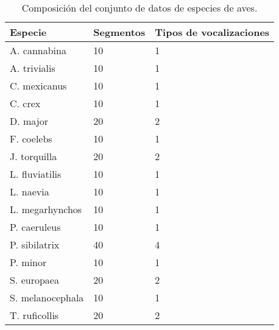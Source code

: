 \begin{table}[h]
    \centering
    \begin{tabular}{lll}
        \hline
        Especie & Segmentos & Tipos de vocalizaciones   \\ \hline
        A. cannabina & 10 & 1                           \\
        A. trivialis & 10 & 1                           \\
        C. mexicanus & 10 & 1                           \\
        C. crex & 10 & 1                                \\
        D. major & 20 & 2                               \\
        F. coelebs & 10 & 1                             \\
        J. torquilla & 20 & 2                           \\
        L. fluviatilis & 10 & 1                         \\
        L. naevia & 10 & 1                              \\
        L. megarhynchos & 10 & 1                        \\
        P. caeruleus & 10 & 1                           \\
        P. sibilatrix & 40 & 4                          \\
        P. minor & 10 & 1                               \\
        S. europaea & 20 & 2                            \\
        S. melanocephala & 10 & 1                       \\
        T. ruficollis & 20 & 2
    \end{tabular}
    \caption{Composición del conjunto de datos de especies de aves.}
    \label{table:birds-dataset}
\end{table}

